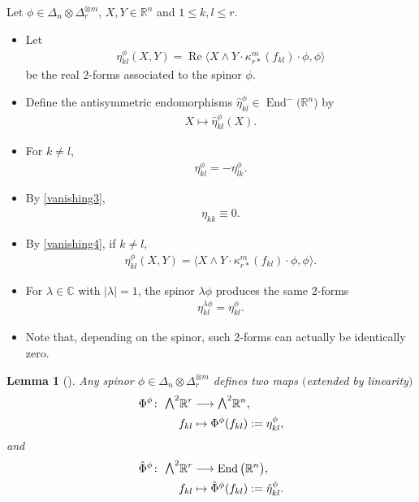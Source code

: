 \documentclass[pdftex]{sigma}
\newcommand{\ext}{\raise1pt\hbox{\small$\bigwedge$}}
\newcommand{\lra}{\longrightarrow}
\numberwithin{equation}{section}
\newtheorem{Lemma}[Theorem]{Lemma}
\begin{document}
\begin{Definition} Let $\phi\in\Delta_n\otimes\Delta_r^{\otimes m}$, $X,Y\in\mathbb{R}^n$ and $1\leq k,l\leq r$.
\begin{itemize}\itemsep=0pt
\item Let
\begin{gather*} \eta_{kl}^{\phi} (X,Y) = \operatorname{Re}\big\langle X\wedge Y\cdot \kappa_{r*}^m(f_{kl})\cdot \phi,\phi\big\rangle \end{gather*}
be the real $2$-forms associated to the spinor $\phi$.
\item Define the antisymmetric endomorphisms $\hat\eta_{kl}^\phi\in\operatorname{End}^-\big(\mathbb{R}^n\big)$ by
\begin{gather*}X\mapsto \hat\eta_{kl}^\phi(X).\end{gather*}
\end{itemize}
\end{Definition}

\begin{Remark}\quad
\begin{itemize}\itemsep=0pt
 \item For $k\not= l$,
\begin{gather*}\eta_{kl}^\phi = - \eta_{lk}^\phi.\end{gather*}
\item By \eqref{vanishing3},
\begin{gather*}\eta_{kk}\equiv 0.\end{gather*}
 \item By \eqref{vanishing4}, if $k\not= l$,
\begin{gather*}\eta_{kl}^{\phi} (X,Y) =\big\langle X\wedge Y\cdot \kappa_{r*}^m(f_{kl})\cdot \phi,\phi\big\rangle .\end{gather*}
\item For $\lambda\in \mathbb{C}$ with $|\lambda|=1$, the spinor $\lambda\phi$ produces the same $2$-forms
\begin{gather*}\eta_{kl}^{\lambda\phi}= \eta_{kl}^\phi.\end{gather*}
\item Note that, depending on the spinor, such 2-forms can actually be identically zero.
\end{itemize}
\end{Remark}

\begin{Lemma}[\cite{Espinosa-Herrera}]\label{lemma:morphisms}
Any spinor $\phi\in\Delta_n\otimes\Delta_r^{\otimes m}$ defines two maps $($extended by linearity$)$
\begin{align*}
\Phi^\phi\colon \ \ext^2 \mathbb{R}^r&\lra \ext^2 \mathbb{R}^n,\\
f_{kl} &\mapsto \Phi^\phi(f_{kl}):=\eta_{kl}^{\phi},
\end{align*}
and
\begin{align*}
\hat\Phi^\phi\colon \ \ext^2 \mathbb{R}^r&\lra \operatorname{End}\big(\mathbb{R}^n\big),\\
f_{kl} &\mapsto \hat\Phi^\phi(f_{kl}):=\hat\eta_{kl}^{\phi}.
\end{align*}
\end{Lemma}
\end{document}
